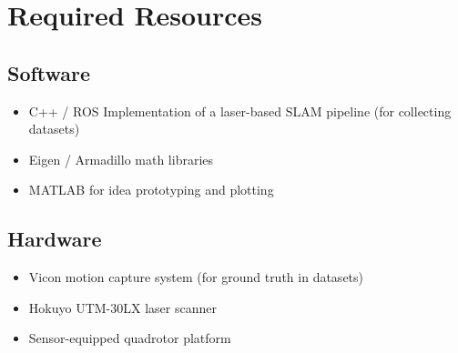 \section{Required Resources}

\subsection*{Software}
\begin{itemize}[noitemsep,topsep=0pt]
\item C++ / ROS Implementation of a laser-based SLAM pipeline (for collecting datasets)
\item Eigen / Armadillo math libraries
\item MATLAB for idea prototyping and plotting
\end{itemize}

\subsection*{Hardware}
\begin{itemize}[noitemsep,topsep=0pt]
\item Vicon motion capture system (for ground truth in datasets)
\item Hokuyo UTM-30LX laser scanner
\item Sensor-equipped quadrotor platform
\end{itemize}
